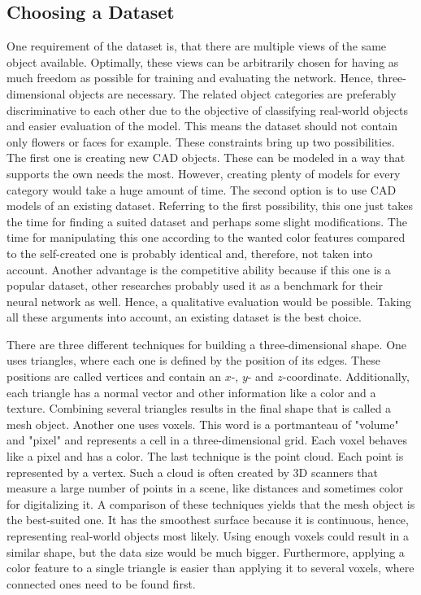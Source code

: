 \subsection{Choosing a Dataset}
\label{sec:dataset-choosing}
One requirement of the dataset is, that there are multiple views of the same object available.
Optimally, these views can be arbitrarily chosen for having as much freedom as possible for training and evaluating the network.
Hence, three-dimensional objects are necessary.
The related object categories are preferably discriminative to each other due to the objective of classifying real-world objects and easier evaluation of the model.
This means the dataset should not contain only flowers or faces for example.
These constraints bring up two possibilities.
The first one is creating new CAD objects.
These can be modeled in a way that supports the own needs the most.
However, creating plenty of models for every category would take a huge amount of time.
The second option is to use CAD models of an existing dataset.
Referring to the first possibility, this one just takes the time for finding a suited dataset and perhaps some slight modifications.
The time for manipulating this one according to the wanted color features compared to the self-created one is probably identical and, therefore, not taken into account.
Another advantage is the competitive ability because if this one is a popular dataset, other researches probably used it as a benchmark for their neural network as well.
Hence, a qualitative evaluation would be possible.
Taking all these arguments into account, an existing dataset is the best choice.

There are three different techniques for building a three-dimensional shape.
One uses triangles, where each one is defined by the position of its edges.
These positions are called vertices and contain an $x$-, $y$- and $z$-coordinate.
Additionally, each triangle has a normal vector and other information like a color and a texture.
Combining several triangles results in the final shape that is called a mesh object.
Another one uses voxels.
This word is a portmanteau of "volume" and "pixel" and represents a cell in a three-dimensional grid.
Each voxel behaves like a pixel and has a color.
The last technique is the point cloud.
Each point is represented by a vertex.
Such a cloud is often created by 3D scanners that measure a large number of points in a scene, like distances and sometimes color for digitalizing it.
A comparison of these techniques yields that the mesh object is the best-suited one.
It has the smoothest surface because it is continuous, hence, representing real-world objects most likely.
Using enough voxels could result in a similar shape, but the data size would be much bigger.
Furthermore, applying a color feature to a single triangle is easier than applying it to several voxels, where connected ones need to be found first.

